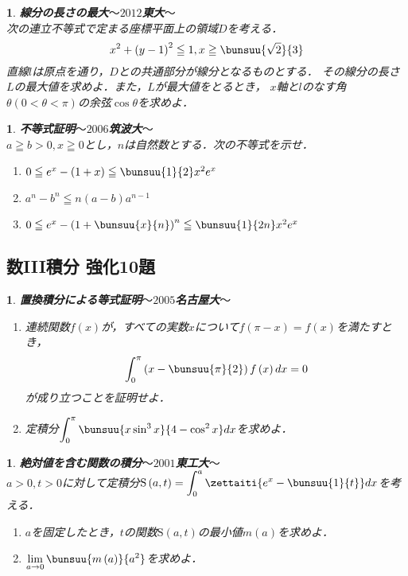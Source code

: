 \documentclass[10pt,
fleqn,
dvipdfmx,
uplatex
]{jsarticle}
\newtheorem{question}[Question]{}
\begin{document}
\begin{question}{\bf\boldmath 線分の長さの最大$〜2012$東大$〜$}\\
次の連立不等式で定まる座標平面上の領域$D$を考える．
\[x^2+\left(y-1\right)^2\leqq 1, x\geqq \bunsuu{{\sqrt 2}}{3}\]
直線$l$は原点を通り，$D$との共通部分が線分となるものとする．
その線分の長さ$L$の最大値を求めよ．また，$L$が最大値をとるとき，
$x$軸と$l$のなす角$\theta \left(0<\theta <\pi \right)$の余弦$\cos \theta$を求めよ．
\end{question}



\begin{question}{\bf\boldmath 不等式証明$〜2006$筑波大$〜$}\\
$a\geqq b>0, x\geqq 0$とし，$n$は自然数とする．次の不等式を示せ．
\begin{enumerate}
\item $0\leqq e^x-\left(1+x\right)\leqq \bunsuu{1}{2}x^2e^x$
\item $a^n-b^n\leqq n\left(a-b\right)a^{n-1}$
\item $0\leqq e^x-\left(1+\bunsuu{x}{n}\right)^n\leqq \bunsuu{1}{{}2n}x^2e^x$
\end{enumerate}

\end{question}

\subsection{数III積分 強化10題}



\begin{question}{\bf\boldmath 置換積分による等式証明$〜2005$名古屋大$〜$}\\

\begin{enumerate}
\item 連続関数$f\left(x\right)$が，すべての実数$x$について$f\left(\pi -x\right)=f\left(x\right)$を満たすとき，
\[\displaystyle\int_0^\pi \left(x-\bunsuu{\pi }{2}\right)f\left(x\right)dx=0\]
が成り立つことを証明せよ．
\item 定積分$\displaystyle\int_0^\pi \bunsuu{{x\sin ^3x}}{{4-\cos ^2x}}dx$を求めよ．
\end{enumerate}

\end{question}



\begin{question}{\bf\boldmath 絶対値を含む関数の積分$〜2001$東工大$〜$}\\
$a>0, t>0$に対して定積分$\text{S}\left(a,t\right)=\displaystyle\int_0^a\zettaiti{e^x-\bunsuu{1}{t}}dx$を考える．
\begin{enumerate}
\item $a$を固定したとき，$t$の関数$\text{S}\left(a,t\right)$の最小値$m\left(a\right)$を求めよ．
\item $\displaystyle\lim_{a\to 0}\bunsuu{{m\left(a\right)}}{{a^2}}$を求めよ．
\end{enumerate}

\end{question}
\end{document}
